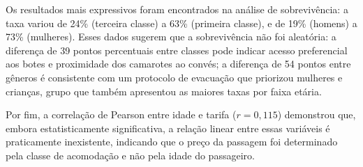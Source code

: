 \documentclass[conference]{IEEEtran}
\begin{document}
Os resultados mais expressivos foram encontrados na análise de sobrevivência:
a taxa variou de 24\% (terceira classe) a 63\% (primeira classe), e de
19\% (homens) a 73\% (mulheres). Esses dados sugerem que a sobrevivência
não foi aleatória: a diferença de 39 pontos percentuais entre classes pode
indicar acesso preferencial aos botes e proximidade dos camarotes ao convés;
a diferença de 54 pontos entre gêneros é consistente com um protocolo de
evacuação que priorizou mulheres e crianças, grupo que também apresentou
as maiores taxas por faixa etária.

Por fim, a correlação de Pearson entre idade e tarifa ($r = 0{,}115$)
demonstrou que, embora estatisticamente significativa, a relação linear entre
essas variáveis é praticamente inexistente, indicando que o preço da
passagem foi determinado pela classe de acomodação e não pela idade do
passageiro.
\end{document}
